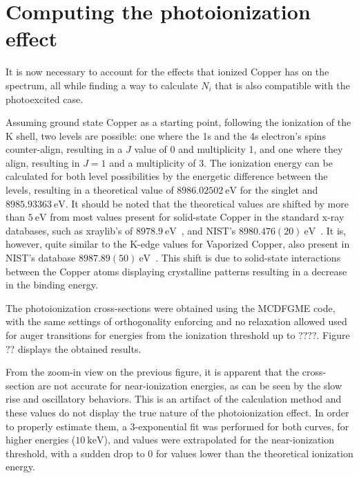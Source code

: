 \section{Computing the photoionization effect}

It is now necessary to account for the effects that ionized Copper has on the spectrum, all while finding a way to calculate $N_i$ that is also compatible with the photoexcited case.


Assuming ground state Copper as a starting point, following the ionization of the K shell, two levels are possible: one where the 1s and the 4s electron's spins counter-align, resulting in a $J$ value of 0 and multiplicity 1, and one where they align, resulting in $J=1$ and a multiplicity of 3. The ionization energy can be calculated for both level possibilities by the energetic difference between the levels, resulting in a theoretical value of $8986.02502\ \si{\electronvolt}$ for the singlet and $8985.93363\ \si{\electronvolt}$. It should be noted that the theoretical values are shifted by more than $5\ \si{\electronvolt}$ from most values present for solid-state Copper in the standard x-ray databases, such as xraylib's of $8978.9\ \si{\electronvolt}$~\cite{SCHOONJANS2011776}, and NIST's $ 8 980.476(20) \ \si{\electronvolt}$~\cite{NIST_database}. It is, however, quite similar to the K-edge values for Vaporized Copper, also present in NIST's database $8 987.89(50)\ \si{\electronvolt}$~\cite{NIST_database}. This shift is due to solid-state interactions between the Copper atoms displaying crystalline patterns  resulting in a decrease in the binding energy.


The photoionization cross-sections were obtained using the \gls{MCDFGME} code,  with the same settings of orthogonality enforcing and no relaxation allowed used for auger transitions for energies from the ionization threshold up to ????. Figure ?? displays the obtained results.


From the zoom-in view on the previous figure, it is apparent that the cross-section are not accurate for near-ionization energies, as can be seen by the slow rise and oscillatory behaviors. This is an artifact of the calculation method and these values do not display the true nature of the photoionization effect. In order to properly estimate them, a 3-exponential fit was performed for both curves, for higher energies ($10\ \si{\kilo\electronvolt}$), and values were extrapolated for the near-ionization threshold, with a sudden drop to 0 for values lower than the theoretical ionization energy.

